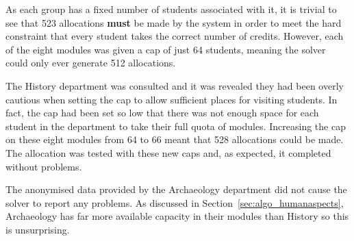 As each group has a fixed number of students associated with it, it is trivial
to see that 523 allocations \textbf{must} be made by the system in order to
meet the hard constraint that every student takes the correct number of
credits. However, each of the eight modules was given a cap of just 64
students, meaning the solver could only ever generate 512 allocations.

The History department was consulted and it was revealed they had been overly
cautious when setting the cap to allow sufficient places for visiting
students. In fact, the cap had been set so low that there was not enough space
for each student in the department to take their full quota of modules.
Increasing the cap on these eight modules from 64 to 66 meant that 528
allocations could be made. The allocation was tested with these new caps and,
as expected, it completed without problems.

The anonymised data provided by the Archaeology department did not cause the
solver to report any problems. As discussed in
Section~\ref{sec:algo_humanaspects}, Archaeology has far more available
capacity in their modules than History so this is unsurprising.

